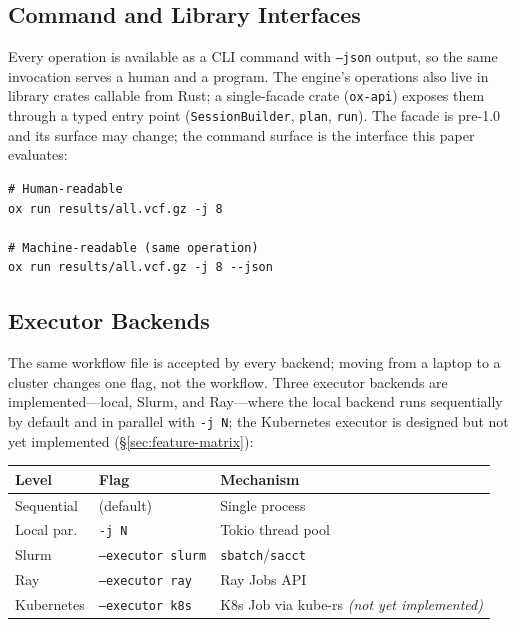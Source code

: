 \documentclass[12pt,a4paper]{article}
\newcommand{\code}[1]{{\texttt{\small\color{inlinecode}#1}}}
\begin{document}
\subsection{Command and Library Interfaces}

Every operation is available as a CLI command with \code{--json} output,
so the same invocation serves a human and a program. The engine's
operations also live in library crates callable from Rust; a
single-facade crate (\code{ox-api}) exposes them through a typed entry
point (\code{Session\allowbreak Builder}, \code{plan}, \code{run}). The
facade is pre-1.0 and its surface may change; the command surface is
the interface this paper evaluates:

\begin{lstlisting}[style=shell]
# Human-readable
ox run results/all.vcf.gz -j 8

# Machine-readable (same operation)
ox run results/all.vcf.gz -j 8 --json
\end{lstlisting}

\subsection{Executor Backends}
\label{sec:distributed}

The same workflow file is accepted by every backend; moving from a
laptop to a cluster changes one flag, not the workflow. Three executor backends are
implemented---local, Slurm, and Ray---where the local backend runs
sequentially by default and in parallel with \code{-j N}; the Kubernetes
executor is designed but not yet
implemented (\S\ref{sec:feature-matrix}):

\begin{table}[htbp]
\centering\small
\begin{tabular}{@{}lll@{}}
\toprule
\textbf{Level} & \textbf{Flag} & \textbf{Mechanism} \\
\midrule
Sequential  & (default)           & Single process \\
Local par.  & \code{-j N}       & Tokio thread pool \\
Slurm       & \code{--executor slurm} & \code{sbatch}/\code{sacct} \\
Ray         & \code{--executor ray}   & Ray Jobs API \\
Kubernetes  & \code{--executor k8s}   & K8s Job via kube-rs \emph{(not yet implemented)} \\
\bottomrule
\end{tabular}
\end{table}
\end{document}
